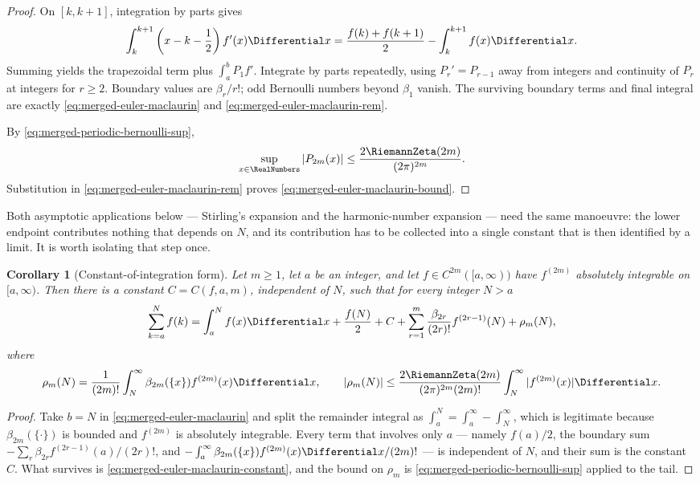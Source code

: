 \documentclass[11pt,a4paper,oneside,openany]{book}
\newtheorem{corollary}[theorem]{Corollary}
\theoremstyle{definition}
\theoremstyle{remark}
\begin{document}
\begin{proof}
On $[k,k+1]$, integration by parts gives
\[
 \int_k^{k+1}\left(x-k-\frac12\right)f'(x)\Differential x
 =\frac{f(k)+f(k+1)}2-\int_k^{k+1}f(x)\Differential x.
\]
Summing yields the trapezoidal term plus $\int_a^bP_1f'$.  Integrate by parts
repeatedly, using $P_r'=P_{r-1}$ away from integers and continuity of $P_r$ at
integers for $r\geq2$.  Boundary values are $\beta_r/r!$; odd Bernoulli
numbers beyond $\beta_1$ vanish.  The surviving boundary terms and final
integral are exactly \eqref{eq:merged-euler-maclaurin} and
\eqref{eq:merged-euler-maclaurin-rem}.

By \eqref{eq:merged-periodic-bernoulli-sup},
\[
 \sup_{x\in\RealNumbers}|P_{2m}(x)|
 \leq\frac{2\RiemannZeta(2m)}{(2\pi)^{2m}}.
\]
Substitution in \eqref{eq:merged-euler-maclaurin-rem} proves
\eqref{eq:merged-euler-maclaurin-bound}.
\end{proof}

Both asymptotic applications below --- Stirling's expansion and the
harmonic-number expansion --- need the same manoeuvre: the lower endpoint
contributes nothing that depends on $N$, and its contribution has to be
collected into a single constant that is then identified by a limit.  It is
worth isolating that step once.

\begin{corollary}[Constant-of-integration form]
\label{cor:merged-euler-maclaurin-constant}
Let $m\ge1$, let $a$ be an integer, and let $f\in C^{2m}([a,\infty))$ have
$f^{(2m)}$ absolutely integrable on $[a,\infty)$.  Then there is a constant
$C=C(f,a,m)$, independent of $N$, such that for every integer $N>a$
\begin{equation}
 \sum_{k=a}^{N}f(k)=\int_a^Nf(x)\Differential x+\frac{f(N)}2+C
 +\sum_{r=1}^{m}\frac{\beta_{2r}}{(2r)!}f^{(2r-1)}(N)+\rho_m(N),  \label{eq:merged-euler-maclaurin-constant}
\end{equation}
where
\begin{equation}
 \rho_m(N)=\frac1{(2m)!}\int_N^\infty\beta_{2m}(\{x\})f^{(2m)}(x)\Differential x,
 \qquad
 |\rho_m(N)|\le\frac{2\RiemannZeta(2m)}{(2\pi)^{2m}(2m)!}
 \int_N^\infty|f^{(2m)}(x)|\Differential x.                       \label{eq:merged-euler-maclaurin-constant-rem}
\end{equation}
\end{corollary}

\begin{proof}
Take $b=N$ in \eqref{eq:merged-euler-maclaurin} and split the remainder
integral as $\int_a^N=\int_a^\infty-\int_N^\infty$, which is legitimate because
$\beta_{2m}(\{\cdot\})$ is bounded and $f^{(2m)}$ is absolutely integrable.
Every term that involves only $a$ --- namely $f(a)/2$, the boundary sum
$-\sum_r\beta_{2r}f^{(2r-1)}(a)/(2r)!$, and
$-\int_a^\infty\beta_{2m}(\{x\})f^{(2m)}(x)\Differential x/(2m)!$ --- is
independent of $N$, and their sum is the constant $C$.  What survives is
\eqref{eq:merged-euler-maclaurin-constant}, and the bound on $\rho_m$ is
\eqref{eq:merged-periodic-bernoulli-sup} applied to the tail.
\end{proof}
\end{document}
